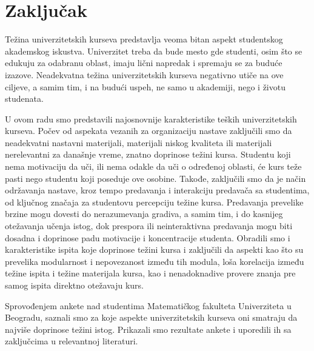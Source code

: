 \documentclass[a4paper]{article}
\begin{document}
\newpage

\section{Zaključak}
\label{sec:zakljucak}

Težina univerzitetskih kurseva predstavlja veoma bitan aspekt studentskog akademskog iskustva. Univerzitet treba da bude mesto gde studenti, osim što se edukuju za odabranu oblast, imaju lični napredak i spremaju se za buduće izazove. Neadekvatna težina univerzitetskih kurseva negativno utiče na ove ciljeve, a samim tim, i na budući uspeh, ne samo u akademiji, nego i životu studenata. 

U ovom radu smo predstavili najosnovnije karakteristike teških univerzitetskih kurseva. Počev od aspekata vezanih za organizaciju nastave zaključili smo da neadekvatni nastavni materijali, materijali niskog kvaliteta ili materijali nerelevantni za današnje vreme, znatno doprinose težini kursa. Studentu koji nema motivaciju da uči, ili nema odakle da uči o određenoj oblasti, će kurs teže pasti nego studentu koji poseduje ove osobine. Takođe, zaključili smo da je način održavanja nastave, kroz tempo predavanja i interakciju predavača sa studentima, od ključnog značaja za studentovu percepciju težine kursa. Predavanja prevelike brzine mogu dovesti do nerazumevanja gradiva, a samim tim, i do kasnijeg otežavanja učenja istog, dok prespora ili neinteraktivna predavanja mogu biti dosadna i doprinose padu motivacije i koncentracije studenta. Obradili smo i karakteristike ispita koje doprinose težini kursa i zaključili da aspekti kao što su prevelika modularnost i nepovezanost između tih modula, loša korelacija između težine ispita i težine materijala kursa, kao i nenadoknadive provere znanja pre samog ispita direktno otežavaju kurs.

Sprovođenjem ankete nad studentima Matematičkog fakulteta Univerziteta u Beogradu, saznali smo za koje aspekte univerzitetskih kurseva oni smatraju da najviše doprinose težini istog. Prikazali smo rezultate ankete i uporedili ih sa zaključcima u relevantnoj literaturi.

\newpage

\appendix
 

\end{document}

